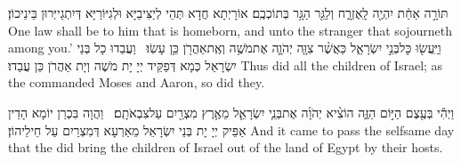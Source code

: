 {תּוֹרָ֣ה אַחַ֔ת יִהְיֶ֖ה לָֽאֶזְרָ֑ח וְלַגֵּ֖ר הַגָּ֥ר בְּתוֹכְכֶֽם׃}
{אוֹרָיְתָא חֲדָא תְּהֵי לְיַצִּיבַיָּא וּלְגִיּוֹרַיָּא דְּיִתְגַייְּרוּן בֵּינֵיכוֹן׃}
{One law shall be to him that is homeborn, and unto the stranger that sojourneth among you.’}{}
{וַיַּֽעֲשׂ֖וּ כׇּל\maqqaf בְּנֵ֣י יִשְׂרָאֵ֑ל כַּאֲשֶׁ֨ר צִוָּ֧ה יְהֹוָ֛ה אֶת\maqqaf מֹשֶׁ֥ה וְאֶֽת\maqqaf אַהֲרֹ֖ן כֵּ֥ן עָשֽׂוּ׃ \setuma }
{וַעֲבַדוּ כָל בְּנֵי יִשְׂרָאֵל כְּמָא דְּפַקֵּיד יְיָ יָת מֹשֶׁה וְיָת אַהֲרֹן כֵּן עֲבַדוּ׃}
{Thus did all the children of Israel; as the \lord\space commanded Moses and Aaron, so did they.}{}

{וַיְהִ֕י בְּעֶ֖צֶם הַיּ֣וֹם הַזֶּ֑ה הוֹצִ֨יא יְהֹוָ֜ה אֶת\maqqaf בְּנֵ֧י יִשְׂרָאֵ֛ל מֵאֶ֥רֶץ מִצְרַ֖יִם עַל\maqqaf צִבְאֹתָֽם׃ \petucha }
{וַהֲוָה בִּכְרַן יוֹמָא הָדֵין אַפֵּיק יְיָ יָת בְּנֵי יִשְׂרָאֵל מֵאַרְעָא דְּמִצְרַיִם עַל חֵילֵיהוֹן׃}
{And it came to pass the selfsame day that the \lord\space did bring the children of Israel out of the land of Egypt by their hosts.}{}

